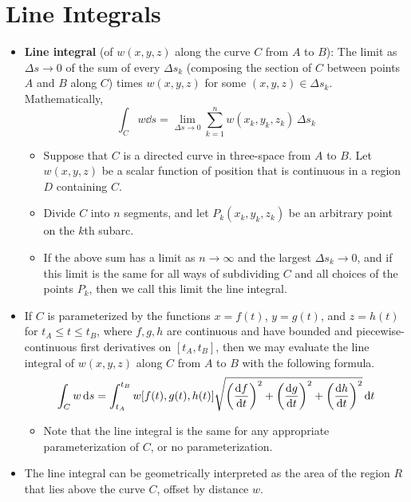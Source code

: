 \documentclass[../main.tex]{subfiles}
\begin{document}
\section{Line Integrals}
\begin{itemize}
    \item \textbf{Line integral} (of $w(x,y,z)$ along the curve $C$ from $A$ to $B$): The limit as $\Delta s\to 0$ of the sum of every $\Delta s_k$ (composing the section of $C$ between points $A$ and $B$ along $C$) times $w(x,y,z)$ for some $(x,y,z)\in\Delta s_k$. Mathematically,
    \begin{equation*}
        \int_Cw\dd{s} = \lim_{\Delta s\to 0}\sum_{k=1}^n w(x_k,y_k,z_k)\, \Delta s_k
    \end{equation*}
    \begin{itemize}
        \item Suppose that $C$ is a directed curve in three-space from $A$ to $B$. Let $w(x,y,z)$ be a scalar function of position that is continuous in a region $D$ containing $C$.
        \item Divide $C$ into $n$ segments, and let $P_k(x_k,y_k,z_k)$ be an arbitrary point on the $k$th subarc.
        \item If the above sum has a limit as $n\to\infty$ and the largest $\Delta s_k\to 0$, and if this limit is the same for all ways of subdividing $C$ and all choices of the points $P_k$, then we call this limit the line integral.
    \end{itemize}
    \item If $C$ is parameterized by the functions $x=f(t)$, $y=g(t)$, and $z=h(t)$ for $t_A\leq t\leq t_B$, where $f,g,h$ are continuous and have bounded and piecewise-continuous first derivatives on $[t_A,t_B]$, then we may evaluate the line integral of $w(x,y,z)$ along $C$ from $A$ to $B$ with the following formula.
    \begin{equation*}
        \int_Cw\dd{s} = \int_{t_A}^{t_B}w[f(t),g(t),h(t)]\sqrt{\left( \dv{f}{t} \right)^2+\left( \dv{g}{t} \right)^2+\left( \dv{h}{t} \right)^2}\dd{t}
    \end{equation*}
    \begin{itemize}
        \item Note that the line integral is the same for any appropriate parameterization of $C$, or no parameterization.
    \end{itemize}
    \item {} The line integral can be geometrically interpreted as the area of the region $R$ that lies above the curve $C$, offset by distance $w$.

\end{itemize}
\end{document}
